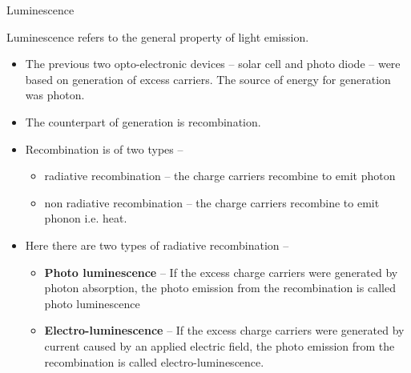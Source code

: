 %
%
%
\begin{frame}{Luminescence}
	\begin{definition}
		Luminescence refers to the general property of light emission.
	\end{definition}
	\begin{itemize}
		\item The previous two opto-electronic devices -- solar cell and photo diode -- were based on generation of excess carriers. The source of energy for generation was photon.
		\item The counterpart of generation is recombination.
		\item Recombination is of two types -- 
		\begin{itemize}
			\item radiative recombination -- the charge carriers recombine to emit photon
			\item non radiative recombination -- the charge carriers recombine to emit phonon i.e. heat. 
		\end{itemize}
		\item Here there are two types of radiative recombination --
		\begin{itemize}
			\item \textbf{Photo luminescence} -- If the excess charge carriers were generated by photon absorption, the photo emission from the recombination is called photo luminescence
			\item \textbf{Electro-luminescence} --  If the excess charge carriers were generated by current caused by an applied electric field, the photo emission from the recombination is called electro-luminescence.
		\end{itemize}
	\end{itemize}
\end{frame}
%

